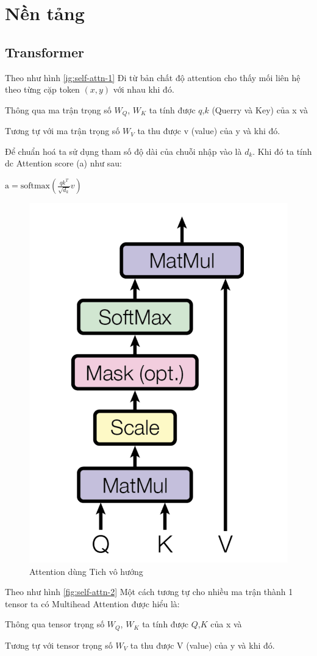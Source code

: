 \documentclass[10pt, conference, a4paper, compsocconf]{IEEEtran}
\begin{document}
\section{Nền tảng}
\subsection{Transformer}
Theo như hình \ref{ig:self-attn-1}
Đi từ bản chất độ attention cho thấy mối liên hệ theo từng cặp token $(x,y)$ với nhau khi đó.

Thông qua ma trận trọng số $W_Q$, $W_K$ ta tính được $q$,$k$ (Querry và Key) của x và 

Tương tự với ma trận trọng số $W_V$ ta thu được v (value) của y và khi đó. 

Để chuẩn hoá ta sử dụng tham số độ dài của chuỗi nhập vào là $d_k$. Khi đó ta tính dc Attention score (a) như sau:
\begin{center}
$\text {a}= \text {softmax}(\frac{qk^{T}}{\sqrt{d_k}}v)$
\end{center}

\begin{figure}[hbt!]
  \centering
  \includegraphics[width=0.5\linewidth]{Image/attn.png}
  \caption{Attention dùng Tich vô hướng}
  \label{fig:self-attn-1}
\end{figure}

Theo như hình \ref{fig:self-attn-2}
Một cách tương tự cho nhiều ma trận thành 1 tensor ta có Multihead Attention được hiểu là:

Thông qua tensor trọng số $W_Q$, $W_K$ ta tính được $Q$,$K$ của x và 

Tương tự với tensor trọng số $W_V$ ta thu được V (value) của y và khi đó. 
\end{document}
